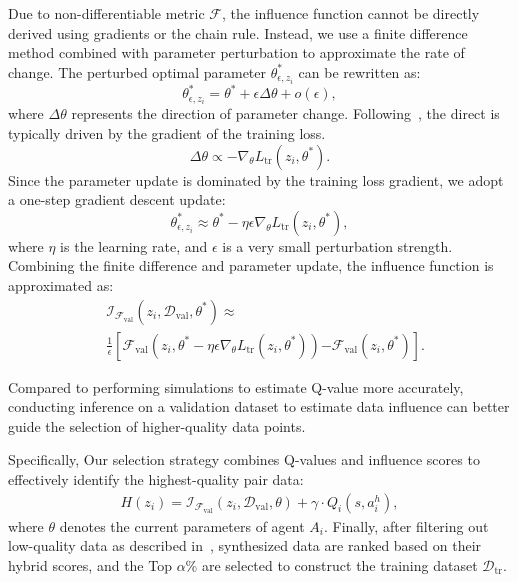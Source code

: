 Due to non-differentiable metric $\mathcal{F}$, the influence function cannot be directly derived using gradients or the chain rule. Instead, we use a finite difference method combined with parameter perturbation to approximate the rate of change. The perturbed optimal parameter $\theta_{\epsilon,z_i}^*$ can be rewritten as:
\begin{equation}
    \theta_{\epsilon,z_i}^* = \theta^* + \epsilon\Delta \theta + o(\epsilon),
\end{equation}
where $\Delta\theta$ represents the direction of parameter change. Following~\citet{yu2024mates}, the direct is typically driven by the gradient of the training loss.
\begin{equation}
    \Delta \theta \propto -\nabla_\theta L_{\text{tr}}(z_i, \theta^*).
\end{equation}
Since the parameter update is dominated by the training loss gradient, we adopt a one-step gradient descent update:
\begin{equation}
    \theta_{\epsilon,z_i}^* \approx \theta^* - \eta\epsilon\nabla_\theta L_{\text{tr}}(z_i,\theta^*),
\end{equation}
where $\eta$ is the learning rate, and $\epsilon$ is a very small perturbation strength. Combining the finite difference and parameter update, the influence function is approximated as:
\begin{equation}
\begin{split}
    &\mathcal{I}_{\mathcal{F}_{\text{val}}}(z_i, \mathcal{D}_{\text{val}}, \theta^*) \approx \\ &\frac{1}{\epsilon} \left[ \mathcal{F}_{\text{val}}(z_i,  \theta^* - \eta\epsilon\nabla_\theta L_{\text{tr}}(z_i,\theta^*)) \right. 
     \left. - \mathcal{F}_{\text{val}}(z_i,\theta^*) \right].
\end{split}
\end{equation}

Compared to performing simulations to estimate Q-value more accurately, conducting inference on a validation dataset to estimate data influence can better guide the selection of higher-quality data points.

Specifically, Our selection strategy combines Q-values and influence scores to effectively identify the highest-quality pair data: 
\begin{equation}
\begin{split}
    H(z_i) = \mathcal{I}_{\mathcal{F}_{\text{val}}}(z_i, \mathcal{D}_{\text{val}}, \theta) + \gamma \cdot Q_i(s, a_i^h) , 
    \label{equation:hybrid score}
\end{split}
\end{equation}
where $\theta$ denotes the current parameters of agent $A_i$. Finally, after filtering out low-quality data as described in~\citet{DBLP:journals/corr/abs-2410-08115}, synthesized data are ranked based on their hybrid scores, and the Top $\alpha$\% are selected to construct the training dataset $\mathcal{D}_{\text{tr}}$.

